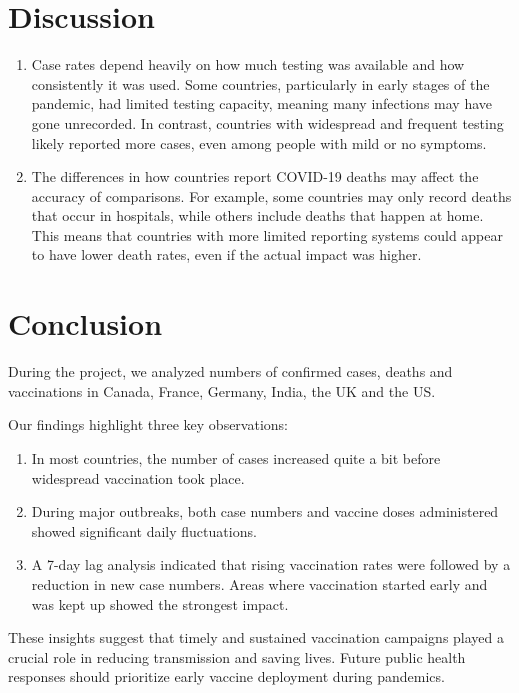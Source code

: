 \documentclass[
  11pt,
]{article}
\providecommand{\tightlist}{%
  \setlength{\itemsep}{0pt}\setlength{\parskip}{0pt}}\usepackage{longtable,booktabs,array}
\begin{document}
\section{Discussion}\label{sec-discussion}

\begin{enumerate}
\def\labelenumi{\arabic{enumi}.}
\tightlist
\item
  Case rates depend heavily on how much testing was available and how
  consistently it was used. Some countries, particularly in early stages
  of the pandemic, had limited testing capacity, meaning many infections
  may have gone unrecorded. In contrast, countries with widespread and
  frequent testing likely reported more cases, even among people with
  mild or no symptoms.
\item
  The differences in how countries report COVID-19 deaths may affect the
  accuracy of comparisons. For example, some countries may only record
  deaths that occur in hospitals, while others include deaths that
  happen at home. This means that countries with more limited reporting
  systems could appear to have lower death rates, even if the actual
  impact was higher.
\end{enumerate}

\section{Conclusion}\label{sec-conclusion}

During the project, we analyzed numbers of confirmed cases, deaths and
vaccinations in Canada, France, Germany, India, the UK and the US.

Our findings highlight three key observations:

\begin{enumerate}
\def\labelenumi{\arabic{enumi}.}
\item
  In most countries, the number of cases increased quite a bit before
  widespread vaccination took place.
\item
  During major outbreaks, both case numbers and vaccine doses
  administered showed significant daily fluctuations.
\item
  A 7-day lag analysis indicated that rising vaccination rates were
  followed by a reduction in new case numbers. Areas where vaccination
  started early and was kept up showed the strongest impact.
\end{enumerate}

These insights suggest that timely and sustained vaccination campaigns
played a crucial role in reducing transmission and saving lives. Future
public health responses should prioritize early vaccine deployment
during pandemics.
\end{document}

